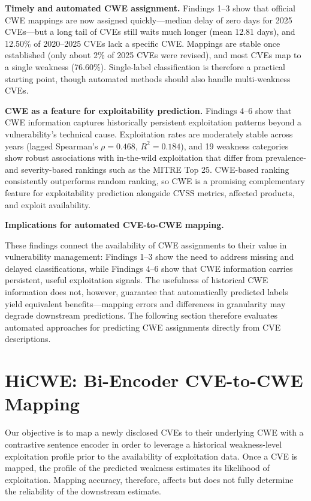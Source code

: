 \documentclass[conference,compsoc]{IEEEtran}
\begin{document}
\textbf{Timely and automated CWE assignment.}
Findings 1--3 show that official CWE mappings are now
assigned quickly---median delay of zero days for 2025
CVEs---but a long tail of CVEs still waits much longer
(mean 12.81 days), and 12.50\% of 2020--2025 CVEs lack a
specific CWE. Mappings are stable once established (only
about 2\% of 2025 CVEs were revised), and most CVEs map to
a single weakness (76.60\%). Single-label classification is
therefore a practical starting point, though automated
methods should also handle multi-weakness CVEs.

\textbf{CWE as a feature for exploitability prediction.}
Findings 4--6 show that CWE information captures
historically persistent exploitation patterns beyond a
vulnerability's technical cause. Exploitation rates are
moderately stable across years (lagged Spearman's
$\rho=0.468$, $R^2=0.184$), and 19 weakness categories
show robust associations with in-the-wild exploitation
that differ from prevalence- and severity-based rankings
such as the MITRE Top 25. CWE-based ranking consistently
outperforms random ranking, so CWE is a promising
complementary feature for exploitability prediction
alongside CVSS metrics, affected products, and exploit
availability.

\textbf{Implications for automated CVE-to-CWE mapping.}

These findings connect the availability of CWE assignments
to their value in vulnerability management: Findings 1--3
show the need to address missing and delayed
classifications, while Findings 4--6 show that CWE
information carries persistent, useful exploitation
signals. The usefulness of historical CWE information does
not, however, guarantee that automatically predicted labels
yield equivalent benefits---mapping errors and differences
in granularity may degrade downstream predictions. The
following section therefore evaluates automated approaches
for predicting CWE assignments directly from CVE
descriptions.


\section{HiCWE: Bi-Encoder CVE-to-CWE Mapping}
\label{sec:hicwe}

Our objective is to map a newly disclosed CVEs to their underlying CWE with a contrastive sentence encoder in order to leverage a historical weakness-level exploitation profile prior to the availability of exploitation data. Once a CVE is mapped, the profile of the predicted weakness estimates its likelihood of exploitation. Mapping accuracy, therefore, affects but does not fully determine the reliability of the downstream estimate.
\end{document}
